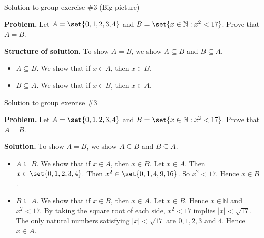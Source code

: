 \documentclass[10pt]{beamer}
\begin{document}
\begin{frame}{Solution to group exercise \#3 (Big picture)}


\textbf{Problem.} Let $A= \set{0,1,2,3,4}$ and  $B= \set{x \in \mathbb{N}: x^2<17}$.  Prove that $A=B$.

\vfill 
\textbf{Structure of solution.} To show $A=B$, we show $A \subseteq B$ and $B \subseteq A$.
\begin{itemize}
\item $\boxed{A \subseteq B.}$ We show that if $x \in A $, then $x \in B$.  
\item $\boxed{B \subseteq A.}$	We show that if $x \in B$, then $x \in A$.
\end{itemize}

\end{frame}


\begin{frame}{Solution to group exercise \#3}


\textbf{Problem.} Let $A= \set{0,1,2,3,4}$ and  $B= \set{x \in \mathbb{N}: x^2<17}$.  Prove that $A=B$.

\vfill 
\textbf{Solution.} To show $A=B$, we show $A \subseteq B$ and $B \subseteq A$. \pause 
\begin{itemize} 
\item $\boxed{A \subseteq B.}$ We show that if $x \in A $, then $x \in B$.  Let $x \in A$.  Then $x \in \set{0,1,2,3,4}$.  Then $x^2 \in \set{0,1,4,9,16}$.  So $x^2<17$.  Hence $x \in B$. \pause 
\item $\boxed{B \subseteq A.}$	We show that if $x \in B$, then $x \in A$. Let $x \in B$.  Hence $x \in \mathbb{N}$ and $x^2<17$.  By taking the square root of each side, $x^2<17$ implies   $|x|<\sqrt{17}$.   The only natural numbers satisfying $|x|<\sqrt{17}$ are $0,1,2,3$ and $4$.  Hence $x \in A$. 
\end{itemize}

\end{frame}
\end{document}
